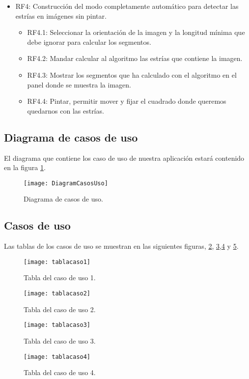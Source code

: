 \begin{itemize}
\item RF4: Construcción del modo completamente automático para detectar las estrías en imágenes sin pintar.
	\begin{itemize}
		\item RF4.1: Seleccionar la orientación de la imagen y la longitud mínima que debe ignorar para calcular los segmentos. 
		\item RF4.2: Mandar calcular al algoritmo las estrías que contiene la imagen.
		\item RF4.3: Mostrar los segmentos que ha calculado con el algoritmo en el panel donde se muestra la imagen.					
		\item RF4.4: Pintar, permitir mover y fijar el cuadrado donde queremos quedarnos con las estrías.
	\end{itemize}
\end{itemize}					

\subsection{Diagrama de casos de uso}
El diagrama que contiene los caso de uso de nuestra aplicación estará contenido en la figura \ref{fig:diagramCasosUso}.	



\begin{figure}[h]
\centering
\texttt{[image: DiagramCasosUso]}
\caption{Diagrama de casos de uso.}
\label{fig:diagramCasosUso}
\end{figure}
 
\subsection{Casos de uso}
Las tablas de los casos de uso se muestran en las siguientes figuras, \ref{fig:tablacaso1}, \ref{fig:tablacaso2},\ref{fig:tablacaso3} y \ref{fig:tablacaso4}.
			 
\begin{figure}[h]
\centering
\texttt{[image: tablacaso1]}
\caption{Tabla del caso de uso 1.}
\label{fig:tablacaso1}
\end{figure}

\begin{figure}[h]
\centering
\texttt{[image: tablacaso2]}
\caption{Tabla del caso de uso 2.}
\label{fig:tablacaso2}
\end{figure}

\begin{figure}[h]
\centering
\texttt{[image: tablacaso3]}
\caption{Tabla del caso de uso 3.}
\label{fig:tablacaso3}
\end{figure}

\begin{figure}[h]
\centering
\texttt{[image: tablacaso4]}
\caption{Tabla del caso de uso 4.}
\label{fig:tablacaso4}
\end{figure}
